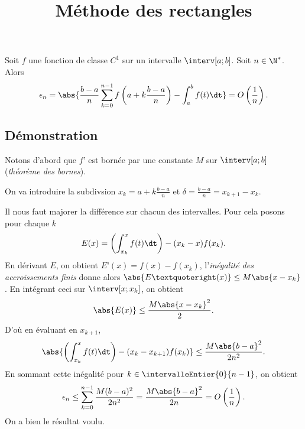 \documentclass[fontsize=12pt,twoside=false,parskip=half, french]{scrartcl}
\title{Méthode des rectangles}
\date{}
\author{}
\begin{document}
\maketitle
   \begin{Theoreme}
      Soit $f$ une fonction de classe $C^1$ sur un intervalle $\interv[a; b]$. Soit $n \in \N^*$. Alors
      \[
        \epsilon_n = \abs{\frac{b - a}{n}\sum_{k = 0}^{n - 1} f\left(a + k \frac{b - a}{n}\right) - \int_a^b f(t) \dt} = O\left(\frac{1}{n}\right).
      \]
   \end{Theoreme}
   \subsection{Démonstration}
      Notons d’abord que $f’$ est bornée par une constante $M$ sur $\interv[a; b]$ (\emph{théorème des bornes}).
      
      On va introduire la subdivsion $x_k = a + k \frac{b - a}{n}$ et $\delta = \frac{b - a}{n} = x_{k + 1} - x_k$.

      Il nous faut majorer la différence sur chacun des intervalles. Pour cela posons pour chaque $k$
      \[
         E(x) = \left(\int_{x_k}^{x} f(t) \dt \right) - (x_k - x) f(x_k).
      \]
      En dérivant $E$, on obtient $E’(x) = f(x) - f(x_k)$, l’\emph{inégalité des accroissements finis} donne alors
      $\abs{E’(x)} \leq M\abs{x - x_k}$. En intégrant ceci sur $\interv[x; x_k]$, on obtient
      \[
         \abs{E(x)} \leq \frac{M\abs{x - x_k}^2}{2}.
      \]
      D’où en évaluant en $x_{k + 1}$,
      \[
         \abs{\left(\int_{x_k}^{x} f(t) \dt \right) - (x_k - x_{k + 1}) f(x_k)} \leq \frac{M\abs{b - a}^2}{2n^2}.
      \]
      En sommant cette inégalité pour $k \in \intervalleEntier{0}{n - 1}$, on obtient
      \[
         \epsilon_n  \leq \sum_{k = 0}^{n - 1} \frac{M(b - a)^2}{2n^2} = \frac{M\abs{b - a}^2}{2n} = O\left(\frac{1}{n}\right).
      \]
      On a bien le résultat voulu.
\end{document}
